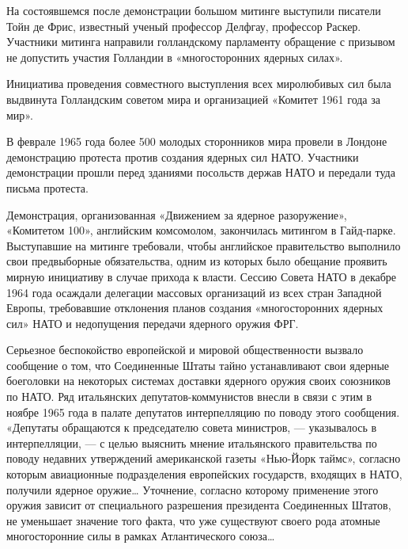 \documentclass[12pt, a4paper, openany]{book}
\begin{document}
	На состоявшемся после демонстрации большом митинге выступили писатели Тойн де Фрис, известный ученый профессор Делфгау, профессор Раскер. Участники митинга направили голландскому парламенту обращение с призывом не допустить участия Голландии в «многосторонних ядерных силах».
	
	Инициатива проведения совместного выступления всех миролюбивых сил была выдвинута Голландским советом мира и организацией «Комитет 1961 года за мир».
	
	В феврале 1965 года более 500 молодых сторонников мира провели в Лондоне демонстрацию протеста против создания ядерных сил НАТО. Участники демонстрации прошли перед зданиями посольств держав НАТО и передали туда письма протеста.
	
	Демонстрация, организованная «Движением за ядерное разоружение», «Комитетом 100», английским комсомолом, закончилась митингом в Гайд-парке. Выступавшие на митинге требовали, чтобы английское правительство выполнило свои предвыборные обязательства, одним из которых было обещание проявить мирную инициативу в случае прихода к власти. Сессию Совета НАТО в декабре 1964 года осаждали делегации массовых организаций из всех стран Западной Европы, требовавшие отклонения планов создания «многосторонних ядерных сил» НАТО и недопущения передачи ядерного оружия ФРГ.
	
	Серьезное беспокойство европейской и мировой общественности вызвало сообщение о том, что Соединенные Штаты тайно устанавливают свои ядерные боеголовки на некоторых системах доставки ядерного оружия своих союзников по НАТО. Ряд итальянских депутатов-коммунистов внесли в связи с этим в ноябре 1965 года в палате депутатов интерпелляцию по поводу этого сообщения. «Депутаты обращаются к председателю совета министров, — указывалось в интерпелляции, — с целью выяснить мнение итальянского правительства по поводу недавних утверждений американской газеты «Нью-Йорк таймс», согласно которым авиационные подразделения европейских государств, входящих в НАТО, получили ядерное оружие… Уточнение, согласно которому применение этого оружия зависит от специального разрешения президента Соединенных Штатов, не уменьшает значение того факта, что уже существуют своего рода атомные многосторонние силы в рамках Атлантического союза…
	
\end{document}
